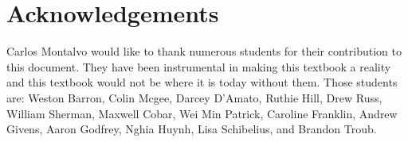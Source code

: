 \section*{Acknowledgements}

Carlos Montalvo would like to thank numerous students for their
contribution to this document. They have been instrumental in making
this textbook a reality and this textbook would not be where it is
today without them. Those students are: Weston Barron, Colin Mcgee,
Darcey D'Amato, Ruthie Hill, Drew Russ, William Sherman, Maxwell Cobar, Wei Min Patrick, Caroline
Franklin, Andrew Givens, Aaron Godfrey, Nghia Huynh, Lisa Schibelius,
and Brandon Troub.

\newpage

\tableofcontents

\newpage
